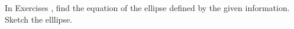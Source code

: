{\noindent In Exercises}
{, find the equation of the ellipse defined by the given information. Sketch the elllipse.
}

